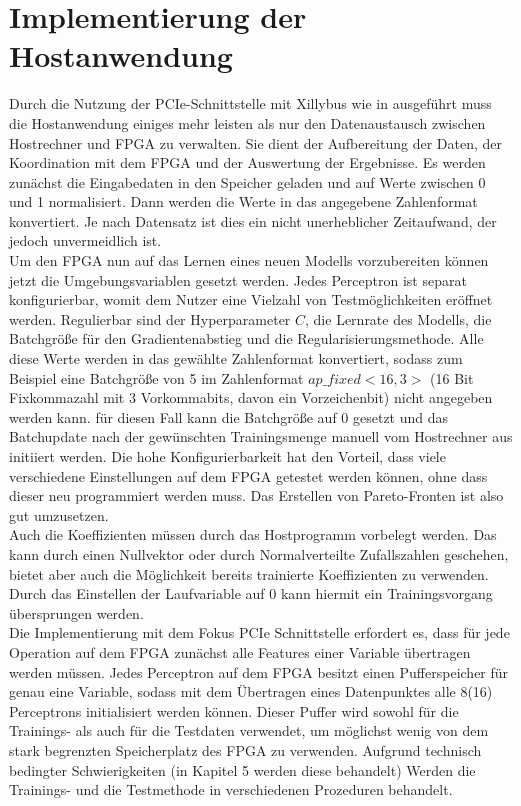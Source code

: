 \section{Implementierung der Hostanwendung}
Durch die Nutzung der PCIe-Schnittstelle mit Xillybus wie in \cite{DILL} ausgeführt muss die Hostanwendung einiges mehr leisten als nur den Datenaustausch zwischen Hostrechner und FPGA zu verwalten. Sie dient der Aufbereitung der Daten, der Koordination mit dem FPGA und der Auswertung der Ergebnisse. Es werden zunächst die Eingabedaten in den Speicher geladen und auf Werte zwischen 0 und 1 normalisiert. Dann werden die Werte in das angegebene Zahlenformat konvertiert. Je nach Datensatz ist dies ein nicht unerheblicher Zeitaufwand, der jedoch unvermeidlich ist.\\
Um den FPGA nun auf das Lernen eines neuen Modells vorzubereiten können jetzt die Umgebungsvariablen gesetzt werden. Jedes Perceptron ist separat konfigurierbar, womit dem Nutzer eine Vielzahl von Testmöglichkeiten eröffnet werden. Regulierbar sind der Hyperparameter $C$, die Lernrate des Modells, die Batchgröße für den Gradientenabstieg und die Regularisierungsmethode. Alle diese Werte werden in das gewählte Zahlenformat konvertiert, sodass zum Beispiel eine Batchgröße von 5 im Zahlenformat $ap\_fixed<16,3>$ (16 Bit Fixkommazahl mit 3 Vorkommabits, davon ein Vorzeichenbit) nicht angegeben werden kann. für diesen Fall kann die Batchgröße auf 0 gesetzt und das Batchupdate nach der gewünschten Trainingsmenge manuell vom Hostrechner aus initiiert werden. Die hohe Konfigurierbarkeit hat den Vorteil, dass viele verschiedene Einstellungen auf dem FPGA getestet werden können, ohne dass dieser neu programmiert werden muss. Das Erstellen von Pareto-Fronten ist also gut umzusetzen.\\
Auch die Koeffizienten müssen durch das Hostprogramm vorbelegt werden. Das kann durch einen Nullvektor oder durch Normalverteilte Zufallszahlen geschehen, bietet aber auch die Möglichkeit bereits trainierte Koeffizienten zu verwenden. Durch das Einstellen der Laufvariable auf 0 kann hiermit ein Trainingsvorgang übersprungen werden.\\
Die Implementierung mit dem Fokus PCIe Schnittstelle erfordert es, dass für jede Operation auf dem FPGA zunächst alle Features einer Variable übertragen werden müssen. Jedes Perceptron auf dem FPGA besitzt einen Pufferspeicher für genau eine Variable, sodass mit dem Übertragen eines Datenpunktes alle 8(16) Perceptrons initialisiert werden können. Dieser Puffer wird sowohl für die Trainings- als auch für die Testdaten verwendet, um möglichst wenig von dem stark begrenzten Speicherplatz des FPGA zu verwenden.
Aufgrund technisch bedingter Schwierigkeiten (in Kapitel 5 werden diese behandelt) Werden die Trainings- und die Testmethode in verschiedenen Prozeduren behandelt. 
